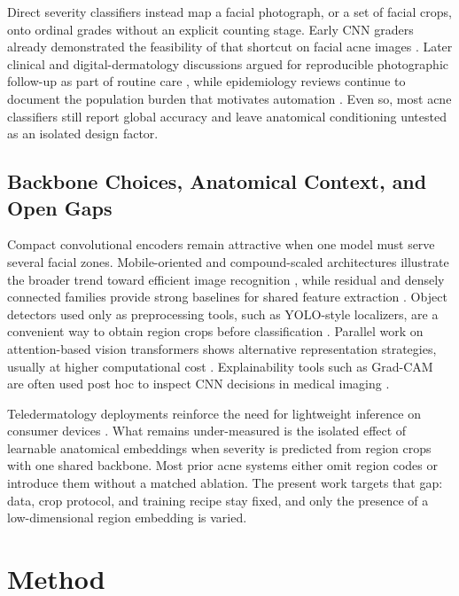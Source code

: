 \documentclass[10pt,conference]{IEEEtran}
\begin{document}
Direct severity classifiers instead map a facial photograph, or a set of facial crops, onto ordinal grades without an explicit counting stage. Early CNN graders already demonstrated the feasibility of that shortcut on facial acne images \cite{shen2018acne}. Later clinical and digital-dermatology discussions argued for reproducible photographic follow-up as part of routine care \cite{thiboutot2009global,seite2019digital}, while epidemiology reviews continue to document the population burden that motivates automation \cite{bhate2013epi}. Even so, most acne classifiers still report global accuracy and leave anatomical conditioning untested as an isolated design factor.

\subsection{Backbone Choices, Anatomical Context, and Open Gaps}
Compact convolutional encoders remain attractive when one model must serve several facial zones. Mobile-oriented and compound-scaled architectures illustrate the broader trend toward efficient image recognition \cite{sandler2018mobilenetv2,tan2019efficientnet}, while residual and densely connected families provide strong baselines for shared feature extraction \cite{huang2017densenet}. Object detectors used only as preprocessing tools, such as YOLO-style localizers, are a convenient way to obtain region crops before classification \cite{redmon2017yolo9000}. Parallel work on attention-based vision transformers shows alternative representation strategies, usually at higher computational cost \cite{dosovitskiy2021vit}. Explainability tools such as Grad-CAM are often used post hoc to inspect CNN decisions in medical imaging \cite{selvaraju2017gradcam}.

Teledermatology deployments reinforce the need for lightweight inference on consumer devices \cite{byamba2015mobile,minagawa2021aiacne}. What remains under-measured is the isolated effect of learnable anatomical embeddings when severity is predicted from region crops with one shared backbone. Most prior acne systems either omit region codes or introduce them without a matched ablation. The present work targets that gap: data, crop protocol, and training recipe stay fixed, and only the presence of a low-dimensional region embedding is varied.

\section{Method}
\end{document}
